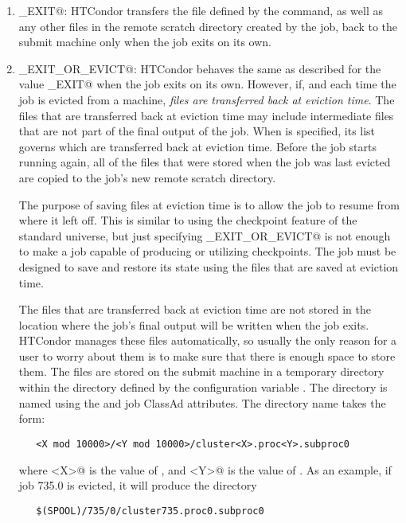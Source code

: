 \begin{enumerate}
\item \verb@ON_EXIT@: HTCondor transfers the file defined by the
 command,
 as well as any other files in the remote scratch directory created by the job,
back to the submit machine only when the job exits on its own.

\item \verb@ON_EXIT_OR_EVICT@: HTCondor behaves the same as described
for the value \verb@ON_EXIT@ when the job exits on its own.
However, if, and each time the job is evicted from a machine,
\emph{files are transferred back at eviction time}.  The files that
are transferred back at eviction time may include intermediate files
that are not part of the final output of the job.
When  is specified,
its list governs which are transferred back at eviction time.
Before the job starts running again, 
all of the files that were stored when the job
was last evicted are copied to the job's new remote scratch
directory.

The purpose of saving files at eviction time is to allow the job to
resume from where it left off.
This is similar to using the checkpoint feature of the standard universe,
but just specifying \verb@ON_EXIT_OR_EVICT@ is not enough to make a job 
capable of producing or utilizing checkpoints.
The job must be designed to save and restore its state
using the files that are saved at eviction time.

The files that are transferred back at eviction time are not stored in
the location where the job's final output will be written when the job exits.
HTCondor manages these files automatically,
so usually the only reason for a user to worry about them 
is to make sure that there is enough space to store them.
The files are stored on the submit machine in a temporary directory within the
directory defined by the configuration variable . 
The directory is named using the  and  job
ClassAd attributes.  The directory name takes the form:
\begin{verbatim}
   <X mod 10000>/<Y mod 10000>/cluster<X>.proc<Y>.subproc0
\end{verbatim}
where \verb@<X>@ is the value of , and 
\verb@<Y>@ is the value of . 
As an example, if job 735.0 is evicted, it will produce the directory
\begin{verbatim}
   $(SPOOL)/735/0/cluster735.proc0.subproc0
\end{verbatim}

\end{enumerate}

